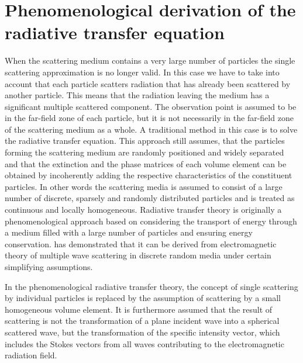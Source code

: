 \section[Radiative transfer equation]
{Phenomenological derivation of the radiative transfer equation}
\label{sec:rtetheory:theory_rte}

When the scattering medium contains a very large number of particles
the single scattering approximation is no longer valid. In this case
we have to take into account that each particle scatters radiation
that has already been scattered by another particle. This means that
the radiation leaving the medium has a significant multiple scattered
component. The observation point is assumed to be in the far-field
zone of each particle, but it is not necessarily in the far-field zone
of the scattering medium as a whole. A traditional method in this case
is to solve the radiative transfer equation.  This approach still
assumes, that the particles forming the scattering medium are randomly
positioned and widely separated and that the extinction and the phase
matrices of each volume element can be obtained by incoherently adding
the respective characteristics of the constituent particles. In other
words the scattering media is assumed to consist of a large number of
discrete, sparsely and randomly distributed particles and is treated
as continuous and locally homogeneous.  Radiative transfer theory is
originally a phenomenological approach based on considering the
transport of energy through a medium filled with a large number of
particles and ensuring energy conservation.
\citet{mishchenko02:_vector} has demonstrated that it can be derived
from electromagnetic theory of multiple wave scattering in discrete
random media under certain simplifying assumptions.

In the phenomenological radiative transfer theory, the concept of
single scattering by individual particles is replaced by the
assumption of scattering by a small homogeneous volume element. It is
furthermore assumed that the result of scattering is not the
transformation of a plane incident wave into a spherical scattered
wave, but the transformation of the specific intensity vector, which
includes the Stokes vectors from all waves contributing to the
electromagnetic radiation field.

